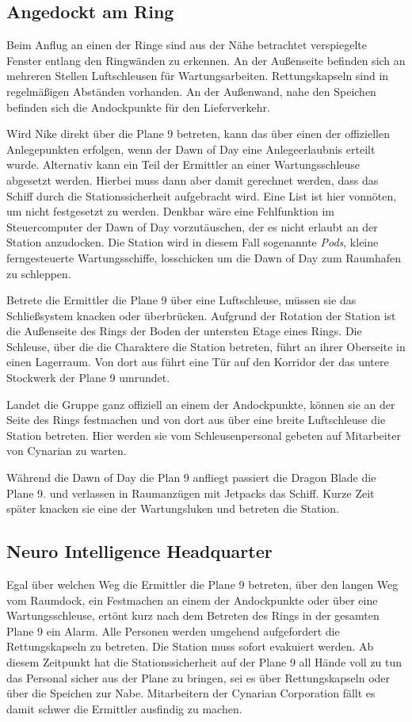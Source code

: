 \subsection{Angedockt am Ring}
Beim Anflug an einen der Ringe sind aus der Nähe betrachtet verspiegelte Fenster entlang den Ringwänden zu erkennen. An der Außenseite befinden sich an mehreren Stellen Luftschleusen für Wartungsarbeiten. Rettungskapseln sind in regelmäßigen Abständen vorhanden. An der Außenwand, nahe den Speichen befinden sich die Andockpunkte für den Lieferverkehr.

Wird Nike direkt über die Plane 9 betreten, kann das über einen der offiziellen Anlegepunkten erfolgen, wenn der Dawn of Day eine Anlegeerlaubnis erteilt wurde. Alternativ kann ein Teil der Ermittler an einer Wartungsschleuse abgesetzt werden. Hierbei muss dann aber damit gerechnet werden, dass das Schiff durch die Stationssicherheit aufgebracht wird. Eine List ist hier vonnöten, um nicht festgesetzt zu werden. Denkbar wäre eine Fehlfunktion im Steuercomputer der Dawn of Day vorzutäuschen, der es nicht erlaubt an der Station anzudocken. Die Station wird in diesem Fall sogenannte \emph{Pods}, kleine ferngesteuerte Wartungsschiffe, losschicken um die Dawn of Day zum Raumhafen zu schleppen.

Betrete die Ermittler die Plane 9 über eine Luftschleuse, müssen sie das Schließsystem knacken oder überbrücken. Aufgrund der Rotation der Station ist die Außenseite des Rings der Boden der untersten Etage eines Rings. Die Schleuse, über die die Charaktere die Station betreten, führt an ihrer Oberseite in einen Lagerraum. Von dort aus führt eine Tür auf den Korridor der das untere Stockwerk der Plane 9 umrundet.

Landet die Gruppe ganz offiziell an einem der Andockpunkte, können sie an der Seite des Rings festmachen und von dort aus über eine breite Luftschleuse die Station betreten. Hier werden sie vom Schleusenpersonal gebeten auf Mitarbeiter von Cynarian zu warten.

Während die Dawn of Day die Plan 9 anfliegt passiert die Dragon Blade die Plane 9. \xl{} und \ml{} verlassen in Raumanzügen mit Jetpacks das Schiff. Kurze Zeit später knacken sie eine der Wartungsluken und betreten die Station.

\subsection{Neuro Intelligence Headquarter}
Egal über welchen Weg die Ermittler die Plane 9 betreten, über den langen Weg vom Raumdock, ein Festmachen an einem der Andockpunkte oder über eine Wartungsschleuse, ertönt kurz nach dem Betreten des Rings in der gesamten Plane 9 ein Alarm. Alle Personen werden umgehend aufgefordert die Rettungskapseln zu betreten. Die Station muss sofort evakuiert werden. Ab diesem Zeitpunkt hat die Stationssicherheit auf der Plane 9 all Hände voll zu tun das Personal sicher aus der Plane zu bringen, sei es über Rettungskapseln oder über die Speichen zur Nabe. Mitarbeitern der Cynarian Corporation fällt es damit schwer die Ermittler ausfindig zu machen.

